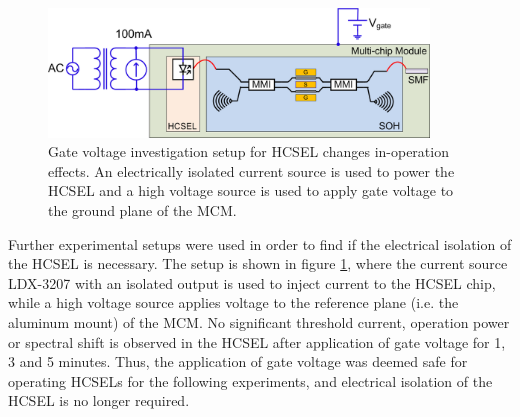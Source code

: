 




\begin{figure}[!ht]
\centering
  \includegraphics[width=0.9\textwidth]{visio/MCM3-SU}
  \caption{Gate voltage investigation setup for HCSEL changes in-operation effects. An electrically isolated current source is used to power the HCSEL and a high voltage source is used to apply gate voltage to the ground plane of the MCM.}
  \label{fig:mcm3-su}
\end{figure}

Further experimental setups were used in order to find if the electrical isolation of the HCSEL is necessary. The setup is shown in figure \ref{fig:mcm3-su}, where the current source LDX-3207 with an isolated output is used to inject current to the HCSEL chip, while a high voltage source applies voltage to the reference plane (i.e. the aluminum mount) of the MCM. No significant threshold current, operation power or spectral shift is observed in the HCSEL after application of gate voltage for 1, 3 and 5 minutes. Thus, the application of gate voltage was deemed safe for operating HCSELs for the following experiments, and electrical isolation of the HCSEL is no longer required.

